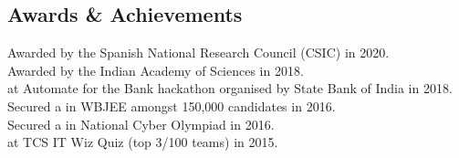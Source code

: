 \documentclass[mm]{simple_style}
\begin{document}
\begin{resume}






\vspace{-2ex}
\sectionline


\section{Awards \& Achievements}
Awarded  by the Spanish National Research Council (CSIC) in 2020.\\
Awarded  by the Indian Academy of Sciences in 2018.\\
 at Automate for the Bank hackathon organised by State Bank of India in 2018.\\
Secured a  in WBJEE amongst 150,000 candidates in 2016.\\
Secured a  in National Cyber Olympiad in 2016.\\
 at TCS IT Wiz Quiz (top 3/100 teams) in 2015.

\vspace{-2ex}
\sectionline



\end{resume}
\end{document}
